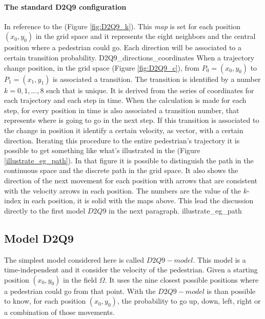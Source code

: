 \documentclass[class=article, crop=false]{standalone}
\begin{document}
\paragraph{The standard D2Q9 configuration} 
In reference to the (Figure \ref{fig:D2Q9_k}).
This \emph{map} is set for each position $(x_0, y_0)$ in the grid space and it represents the eight neighbors and the central position where a pedestrian could go.
Each direction will be associated to a certain transition probability.
	{D2Q9_directions_coordinates}
When a trajectory change position, in the grid space (Figure \ref{fig:D2Q9_c}), from $P_0=(x_0, y_0)$ to $P_1=(x_1, y_1)$ is associated a transition.
The transition is identified by a number $k = 0,1,...,8$ such that is unique.
It is derived from the series of coordinates for each trajectory and each step in time.
When the calculation is made for each step, for every position in time is also associated a transition number, that represents where is going to go in the next step.
If this transition is associated to the change in position it identify a certain velocity, as vector, with a certain direction.
Iterating this procedure to the entire pedestrian's trajectory it is possible to get something like what's illustrated in the (Figure \ref{illustrate_eg_path}).
In that figure it is possible to distinguish the path in the continuous space and the discrete path in the grid space.
It also shows the direction of the next movement for each position with arrows that are consistent with the velocity arrows in each position.
The numbers are the value of the $k$-index in each position, it is solid with the maps above.
This lead the discussion directly to the first model $D2Q9$ in the next paragraph.
	{illustrate_eg_path}



\FloatBarrier
\subsection{Model D2Q9} \label{chap:Model_D2Q9}
The simplest model considered here is called $D2Q9-model$.
This model is a time-independent and it consider the velocity of the pedestrian.
Given a starting position $(x_0, y_0)$ in the field $\Omega$.
It uses the nine closest possible positions where a pedestrian could go from that point.
With the $D2Q9-model$ is than possible to know, for each position $(x_0, y_0)$, the probability to go up, down, left, right or a combination of those movements.
\end{document}
